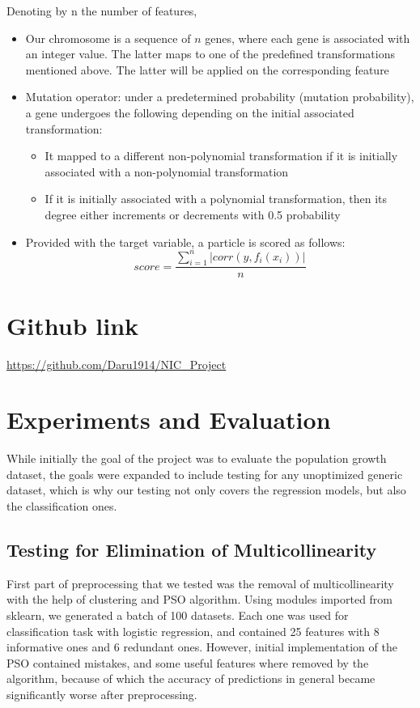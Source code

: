 \documentclass[conference]{IEEEtran}
\begin{document}
Denoting by n the number of features,
\begin{itemize}
	\item Our chromosome is a sequence of $n$ genes, where each gene is associated with an integer value. The latter maps to one of the predefined transformations mentioned above. The latter will be applied on the corresponding feature 
	\item Mutation operator: under a predetermined probability (mutation probability), a gene undergoes the following depending on the initial associated transformation: 
	\begin{itemize}
		\item It mapped to a different non-polynomial transformation if it is initially associated with a non-polynomial transformation
		\item If it is initially associated with a polynomial transformation, then its degree either increments or decrements with 0.5 probability
	\end{itemize}
	\item Provided with the target variable, a particle is scored as follows:
	\begin{equation}
		score=\dfrac{\sum_{i=1}^{n}|corr(y, f_i(x_i))|}{n}
	\end{equation}
\end{itemize}

\section{Github link}
\href{https://github.com/Daru1914/NIC\_Project}{https://github.com/Daru1914/NIC\_Project}

\section{Experiments and Evaluation}

While initially the goal of the project was to evaluate the population growth dataset, the goals were expanded to include testing for any unoptimized generic dataset, which is why our testing not only covers the regression models, but also the classification ones.

\subsection{Testing for Elimination of Multicollinearity}

First part of preprocessing that we tested was the removal of multicollinearity with the help of clustering and PSO algorithm. Using modules imported from sklearn, we generated a batch of 100 datasets. Each one was used for classification task with logistic regression, and contained 25 features with 8 informative ones and 6 redundant ones. However, initial implementation of the PSO contained mistakes, and some useful features where removed by the algorithm, because of which the accuracy of predictions in general became significantly worse after preprocessing.\\
\end{document}
